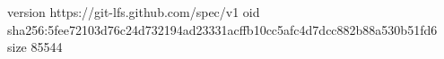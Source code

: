 version https://git-lfs.github.com/spec/v1
oid sha256:5fee72103d76c24d732194ad23331acffb10cc5afc4d7dcc882b88a530b51fd6
size 85544
